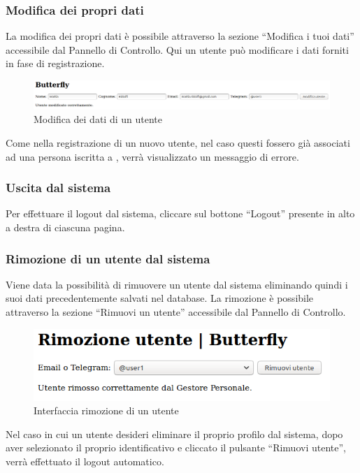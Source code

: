\subsubsection{Modifica dei propri dati}
La modifica dei propri dati è possibile attraverso la sezione ``Modifica i tuoi dati'' accessibile dal Pannello di Controllo.
Qui un utente può modificare i dati forniti in fase di registrazione.
\begin{figure}[H]
	\centering
	\includegraphics[width=\textwidth]{img/modifica_1.png}
	\caption{Modifica dei dati di un utente}
\end{figure}
Come nella registrazione di un nuovo utente, nel caso questi fossero già associati ad una persona iscritta a \progetto, verrà visualizzato un messaggio di errore.

\subsubsection{Uscita dal sistema}
Per effettuare il logout dal sistema, cliccare sul bottone ``Logout'' presente in alto a destra di ciascuna pagina.

\subsubsection{Rimozione di un utente dal sistema}
Viene data la possibilità di rimuovere un utente dal sistema eliminando quindi i suoi dati precedentemente salvati nel database.
La rimozione è possibile attraverso la sezione ``Rimuovi un utente'' accessibile dal Pannello di Controllo.
\begin{figure}[H]
	\centering
	\includegraphics[width=12cm]{img/rimozione_1.png}
	\caption{Interfaccia rimozione di un utente}
\end{figure}
Nel caso in cui un utente desideri eliminare il proprio profilo dal sistema, dopo aver selezionato il proprio identificativo e cliccato il pulsante ``Rimuovi utente'', verrà effettuato il logout automatico.

